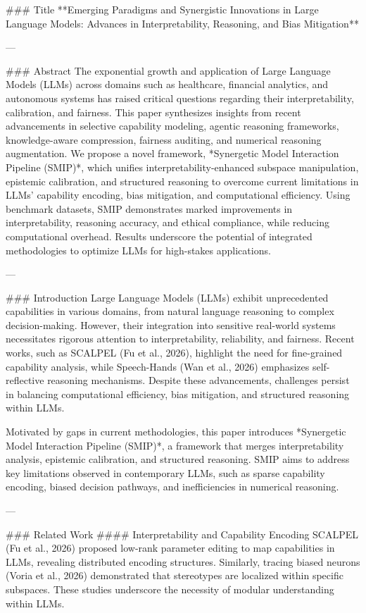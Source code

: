 ### Title  
**Emerging Paradigms and Synergistic Innovations in Large Language Models: Advances in Interpretability, Reasoning, and Bias Mitigation**

---

### Abstract  
The exponential growth and application of Large Language Models (LLMs) across domains such as healthcare, financial analytics, and autonomous systems has raised critical questions regarding their interpretability, calibration, and fairness. This paper synthesizes insights from recent advancements in selective capability modeling, agentic reasoning frameworks, knowledge-aware compression, fairness auditing, and numerical reasoning augmentation. We propose a novel framework, *Synergetic Model Interaction Pipeline (SMIP)*, which unifies interpretability-enhanced subspace manipulation, epistemic calibration, and structured reasoning to overcome current limitations in LLMs' capability encoding, bias mitigation, and computational efficiency. Using benchmark datasets, SMIP demonstrates marked improvements in interpretability, reasoning accuracy, and ethical compliance, while reducing computational overhead. Results underscore the potential of integrated methodologies to optimize LLMs for high-stakes applications.

---

### Introduction  
Large Language Models (LLMs) exhibit unprecedented capabilities in various domains, from natural language reasoning to complex decision-making. However, their integration into sensitive real-world systems necessitates rigorous attention to interpretability, reliability, and fairness. Recent works, such as SCALPEL (Fu et al., 2026), highlight the need for fine-grained capability analysis, while Speech-Hands (Wan et al., 2026) emphasizes self-reflective reasoning mechanisms. Despite these advancements, challenges persist in balancing computational efficiency, bias mitigation, and structured reasoning within LLMs.

Motivated by gaps in current methodologies, this paper introduces *Synergetic Model Interaction Pipeline (SMIP)*, a framework that merges interpretability analysis, epistemic calibration, and structured reasoning. SMIP aims to address key limitations observed in contemporary LLMs, such as sparse capability encoding, biased decision pathways, and inefficiencies in numerical reasoning.

---

### Related Work  
#### Interpretability and Capability Encoding  
SCALPEL (Fu et al., 2026) proposed low-rank parameter editing to map capabilities in LLMs, revealing distributed encoding structures. Similarly, tracing biased neurons (Voria et al., 2026) demonstrated that stereotypes are localized within specific subspaces. These studies underscore the necessity of modular understanding within LLMs.

